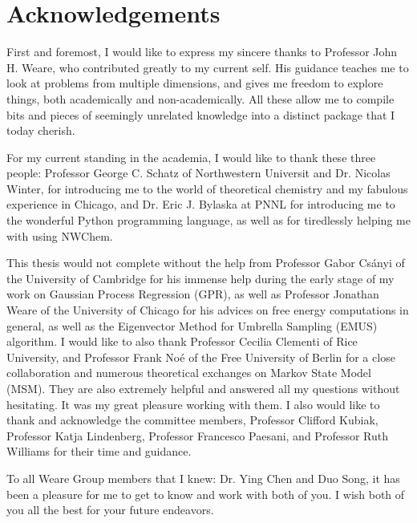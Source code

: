 \newpage

\begingroup
\renewcommand{\cleardoublepage}{}
\clearpage
\chapter*{Acknowledgements}
\endgroup

\begin{spacing}{2.0}
First and foremost, I would like to express my sincere thanks to Professor John H. Weare, who contributed greatly to my current self.
His guidance teaches me to look at problems from multiple dimensions, and gives me freedom to explore things, both academically and
non-academically. All these allow me to compile bits and pieces of seemingly unrelated knowledge into a distinct package that
I today cherish.

For my current standing in the academia, I would like to thank these three people: Professor George C. Schatz of Northwestern Universit
and Dr. Nicolas Winter, for introducing me to the world of theoretical chemistry and my fabulous experience in Chicago, and Dr. Eric J. 
Bylaska at PNNL for introducing me to the wonderful Python programming language, as well as for tiredlessly helping me with using NWChem.

This thesis would not complete without the help from Professor Gabor Cs\'{a}nyi of the University of Cambridge for his immense help
    during the early stage of my work on Gaussian Process Regression (GPR), as well as Professor Jonathan Weare of the University of Chicago for 
    his advices on free energy computations in general, as well as the Eigenvector Method for Umbrella Sampling (EMUS) algorithm. 
I would like to also thank Professor Cecilia Clementi of Rice University,
    and Professor Frank No\'{e} of the Free University of Berlin for a close collaboration and numerous theoretical exchanges on Markov State Model (MSM). 
    They are also extremely helpful and answered all my questions without hesitating. It was my great pleasure working with them. 
I also would like to thank and acknowledge the committee members, Professor Clifford Kubiak, Professor Katja Lindenberg, Professor
Francesco Paesani, and Professor Ruth Williams for their time and guidance.

To all Weare Group members that I knew: Dr. Ying Chen and Duo Song, it has been a pleasure for me to get to know and work with both of you.
I wish both of you all the best for your future endeavors. 


\end{spacing}

